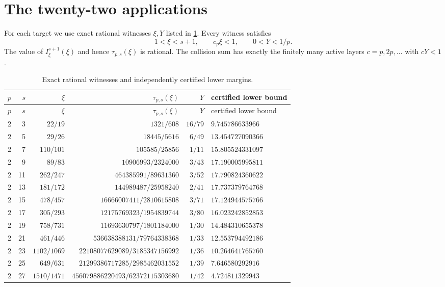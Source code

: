 \documentclass[11pt]{article}
\theoremstyle{definition}
\theoremstyle{remark}
\begin{document}
\section{The twenty-two applications}\label{sec:applications}

For each target we use exact rational witnesses $\xi,Y$ listed in
\cref{tab:22}.  Every witness satisfies
\[
 1<\xi<s+1,
 \qquad c_p\xi<1,
 \qquad0<Y<1/p.
\]
The value of $I^{s+1}_\xi(\xi)$ and hence $\tau_{p,s}(\xi)$ is rational.
The collision sum has exactly the finitely many active layers
$c=p,2p,\ldots$ with $cY<1$.

\begingroup\small
\begin{longtable}{@{}rrrrrl@{}}
\caption{Exact rational witnesses and independently certified lower margins.}
\label{tab:22}\\
\toprule
$p$&$s$&$\xi$&$\tau_{p,s}(\xi)$&$Y$& certified lower bound\\
\midrule
\endfirsthead
\toprule
$p$&$s$&$\xi$&$\tau_{p,s}(\xi)$&$Y$& certified lower bound\\
\midrule
\endhead
2 & 3 & $22/19$ & $1321/608$ & $16/79$ & $9.745786633966$ \\
2 & 5 & $29/26$ & $18445/5616$ & $6/49$ & $13.454727090366$ \\
2 & 7 & $110/101$ & $105585/25856$ & $1/11$ & $15.805524331097$ \\
2 & 9 & $89/83$ & $10906993/2324000$ & $3/43$ & $17.190005995811$ \\
2 & 11 & $262/247$ & $464385991/89631360$ & $3/52$ & $17.790824360622$ \\
2 & 13 & $181/172$ & $144989487/25958240$ & $2/41$ & $17.737379764768$ \\
2 & 15 & $478/457$ & $16666007411/2810615808$ & $3/71$ & $17.124944575766$ \\
2 & 17 & $305/293$ & $12175769323/1954839744$ & $3/80$ & $16.023242852853$ \\
2 & 19 & $758/731$ & $11693630797/1801184000$ & $1/30$ & $14.484310655378$ \\
2 & 21 & $461/446$ & $536638388131/79764338368$ & $1/33$ & $12.553794492186$ \\
2 & 23 & $1102/1069$ & $22108077629089/3185347156992$ & $1/36$ & $10.264641765760$ \\
2 & 25 & $649/631$ & $21299386717285/2985462031552$ & $1/39$ & $7.646580292916$ \\
2 & 27 & $1510/1471$ & $456079886220493/62372115303680$ & $1/42$ & $4.724811329943$ \\

\end{longtable}
\end{document}
